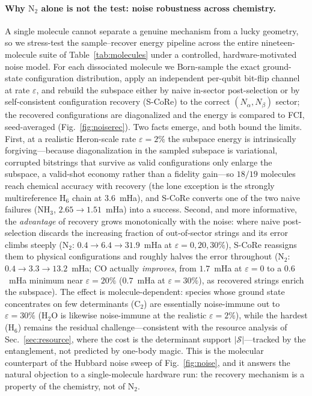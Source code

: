 \paragraph{Why $\mathrm{N_2}$ alone is not the test: noise robustness across chemistry.} A single
molecule cannot separate a genuine mechanism from a lucky geometry, so we stress-test the
sample--recover energy pipeline across the entire nineteen-molecule suite of
Table~\ref{tab:molecules} under a controlled, hardware-motivated noise model. For each dissociated
molecule we Born-sample the exact ground-state configuration distribution, apply an independent
per-qubit bit-flip channel at rate $\varepsilon$, and rebuild the subspace either by naive
in-sector post-selection or by self-consistent configuration recovery (S-CoRe) to the correct $(N_\alpha,N_\beta)$
sector; the recovered configurations are diagonalized and the energy is compared to FCI, seed-averaged
(Fig.~\ref{fig:noiserec}). Two facts emerge, and both bound the limits. First, at a
realistic Heron-scale rate $\varepsilon=2\%$ the subspace energy is intrinsically forgiving---because
diagonalization in the sampled subspace is variational, corrupted bitstrings that survive as valid
configurations only enlarge the subspace, a valid-shot economy rather than a fidelity gain---so $18/19$ molecules reach chemical accuracy with recovery
(the lone exception is the strongly multireference $\mathrm{H_6}$ chain at $3.6$~mHa), and S-CoRe
converts one of the two naive failures ($\mathrm{NH_3}$, $2.65\!\to\!1.51$~mHa) into a success. Second, and
more informative, the \emph{advantage} of recovery grows monotonically with the noise: where naive
post-selection discards the increasing fraction of out-of-sector strings and its error climbs steeply
($\mathrm{N_2}$: $0.4\!\to\!6.4\!\to\!31.9$~mHa at $\varepsilon=0,20,30\%$), S-CoRe reassigns them to
physical configurations and roughly halves the error throughout ($\mathrm{N_2}$: $0.4\!\to\!3.3\!\to
\!13.2$~mHa; $\mathrm{CO}$ actually \emph{improves}, from $1.7$~mHa at $\varepsilon=0$ to a $0.6$~mHa
minimum near $\varepsilon=20\%$ ($0.7$~mHa at $\varepsilon=30\%$), as recovered strings enrich
the subspace). The effect is molecule-dependent: species whose ground state concentrates on few
determinants ($\mathrm{C_2}$) are essentially noise-immune out to $\varepsilon=30\%$ ($\mathrm{H_2O}$ is
likewise noise-immune at the realistic $\varepsilon=2\%$),
while the hardest ($\mathrm{H_6}$) remains the residual challenge---consistent with the resource
analysis of Sec.~\ref{sec:resource}, where the cost is the determinant support $|\mathcal S|$---tracked by the entanglement, not predicted by one-body magic.
This is the molecular counterpart of the Hubbard noise sweep of Fig.~\ref{fig:noise}, and it answers
the natural objection to a single-molecule hardware run: the recovery mechanism is a property of the
chemistry, not of $\mathrm{N_2}$.

